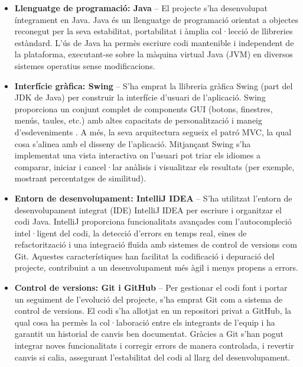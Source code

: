 \documentclass{ieeetj}
\begin{document}
\begin{itemize}
    \item \textbf{Llenguatge de programació: Java} – El projecte s’ha desenvolupat íntegrament en Java. Java és un llenguatge de programació orientat a objectes reconegut per la seva estabilitat, portabilitat i àmplia col·lecció de llibreries estàndard. L’ús de Java ha permès escriure codi mantenible i independent de la plataforma, executant-se sobre la màquina virtual Java (JVM) en diversos sistemes operatius sense modificacions.\newline

    \item \textbf{Interfície gràfica: Swing} – S’ha emprat la llibreria gràfica Swing (part del JDK de Java) per construir la interfície d’usuari de l’aplicació. Swing proporciona un conjunt complet de components GUI (botons, finestres, menús, taules, etc.) amb altes capacitats de personalització i maneig d’esdeveniments \cite{SwingLibrary}. A més, la seva arquitectura segueix el patró MVC, la qual cosa s’alinea amb el disseny de l’aplicació\cite{MVC_Theory}. Mitjançant Swing s’ha implementat una vista interactiva on l’usuari pot triar els idiomes a comparar, iniciar i cancel·lar anàlisis i visualitzar els resultats (per exemple, mostrant percentatges de similitud).\newline

    \item \textbf{Entorn de desenvolupament: IntelliJ IDEA} – S’ha utilitzat l’entorn de desenvolupament integrat (IDE) IntelliJ IDEA per escriure i organitzar el codi Java. IntelliJ proporciona funcionalitats avançades com l’autocompleció intel·ligent del codi, la detecció d’errors en temps real, eines de refactorització i una integració fluïda amb sistemes de control de versions com Git. Aquestes característiques han facilitat la codificació i depuració del projecte, contribuint a un desenvolupament més àgil i menys propens a errors.\newline

    \item \textbf{Control de versions: Git i GitHub} – Per gestionar el codi font i portar un seguiment de l’evolució del projecte, s’ha emprat Git com a sistema de control de versions. El codi s’ha allotjat en un repositori privat a GitHub, la qual cosa ha permès la col·laboració entre els integrants de l’equip i ha garantit un historial de canvis ben documentat. Gràcies a Git s’han pogut integrar noves funcionalitats i corregir errors de manera controlada, i revertir canvis si calia, assegurant l’estabilitat del codi al llarg del desenvolupament.\newline


\end{itemize}
\end{document}

